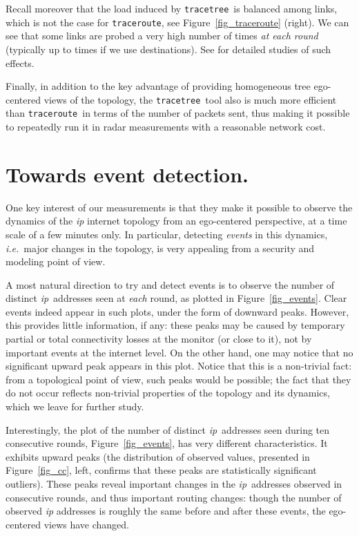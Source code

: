 \documentclass[times, 10pt,twocolumn]{article}
\newcommand{\ie}{{\em i.e.}}
\newcommand{\traceroute}{{\tt trace\-route}}
\newcommand{\tracetree}{{\tt trace\-tree}}
\newcommand{\ip}{\mbox{\em \sc ip}}
\begin{document}
Recall moreover that the load induced by \tracetree\ is balanced among links,
which is not the case for \traceroute{}, see Figure~\ref{fig_traceroute} (right).
We can see that some links are probed a very high number of times {\em at each round}
(typically up to  times if we use  destinations).
See \cite{DTJSAC,DTSigmetrics,probingScheme} for detailed studies of such effects.

Finally, in addition to the key advantage of providing homogeneous tree ego-centered views of the topology, the \tracetree\ tool also is much more efficient than \traceroute\ in terms of the number of packets sent, thus making it possible to repeatedly run it in radar measurements
with a reasonable network cost.



\section{Towards event detection.}
\label{sec_event}

One key interest of our measurements is that they make it possible to
observe the dynamics of the \ip{} internet topology from an ego-centered
perspective, at a time scale of a few minutes only.
In
particular, detecting {\em events} in this dynamics, \ie\ major
changes in the topology, is very appealing from a security and
modeling point of view.

A most natural direction to try and detect events is to observe the
number of distinct \ip\ addresses seen at {\em each} round, as plotted
in Figure~\ref{fig_events}. Clear events indeed appear in such plots,
under the form of downward peaks.
However, this provides little
information, if any: these peaks may be caused by temporary partial or total 
connectivity losses at the monitor (or close to it), not by important
events at the internet level. On the other hand, one may notice that
no significant upward peak appears in this plot. Notice that this is a
non-trivial fact: from a topological point of view, such peaks would
be possible; the fact that they do not occur reflects non-trivial
properties of the topology and its dynamics, which we leave for
further study.

Interestingly, the plot of the number of distinct \ip\ addresses seen
during ten consecutive rounds, Figure~\ref{fig_events}, has very
different characteristics. It exhibits
upward peaks (the distribution of observed values,  presented
in Figure~\ref{fig_cc}, left, confirms that these peaks are statistically significant
outliers). These peaks reveal important changes in the \ip\ addresses
observed in consecutive rounds, and thus important routing changes:
though the number of observed \ip{} addresses is roughly the same before
and after these events,
the ego-centered views have changed.
\end{document}
